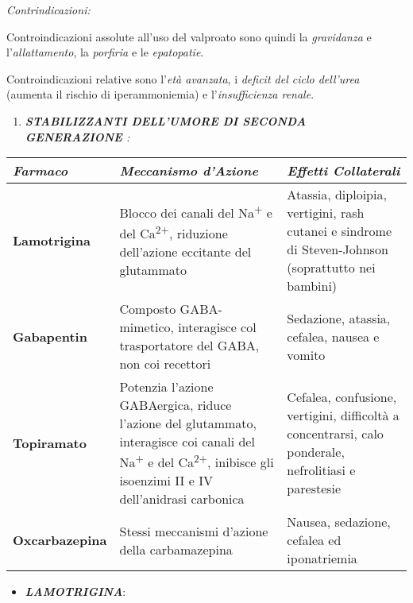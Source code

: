 \documentclass[]{article}
\begin{document}
\emph{\emph{Contrindicazioni:}}

Controindicazioni assolute all'uso del valproato sono quindi la
\emph{gravidanza} e l'\emph{allattamento}, la \emph{porfiria} e le
\emph{epatopatie}.

Controindicazioni relative sono l'\emph{età avanzata}, i \emph{deficit
del ciclo dell'urea} (aumenta il rischio di iperammoniemia) e
l'\emph{insufficienza renale}.

\begin{enumerate}
\def\labelenumi{\arabic{enumi}.}
\item
  \emph{\textbf{STABILIZZANTI DELL'UMORE DI SECONDA GENERAZIONE} :}
\end{enumerate}

\begin{longtable}[]{@{}lll@{}}
\toprule
\textbf{\emph{Farmaco}} & \textbf{\emph{Meccanismo d'Azione}} &
\textbf{\emph{Effetti Collaterali}}\tabularnewline
\midrule
\endhead
\textbf{Lamotrigina} & Blocco dei canali del Na\textsuperscript{+} e del
Ca\textsuperscript{2+}, riduzione dell'azione eccitante del glutammato &
Atassia, diploipia, vertigini, rash cutanei e sindrome di Steven-Johnson
(soprattutto nei bambini)\tabularnewline
\textbf{Gabapentin} & Composto GABA-mimetico, interagisce col
trasportatore del GABA, non coi recettori & Sedazione, atassia, cefalea,
nausea e vomito\tabularnewline
\textbf{Topiramato} & Potenzia l'azione GABAergica, riduce l'azione del
glutammato, interagisce coi canali del Na\textsuperscript{+} e del
Ca\textsuperscript{2+}, inibisce gli isoenzimi II e IV dell'anidrasi
carbonica & Cefalea, confusione, vertigini, difficoltà a concentrarsi,
calo ponderale, nefrolitiasi e parestesie\tabularnewline
\textbf{Oxcarbazepina} & Stessi meccanismi d'azione della carbamazepina
& Nausea, sedazione, cefalea ed iponatriemia\tabularnewline
\bottomrule
\end{longtable}

\begin{itemize}
\item
  \textbf{\emph{LAMOTRIGINA}}:
\end{itemize}
\end{document}
